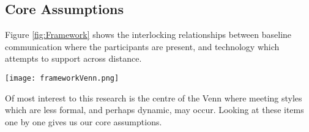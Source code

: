 \subsection{Core Assumptions}
Figure \ref{fig:Framework} shows the interlocking relationships between baseline communication where the participants are present, and technology which attempts to support across distance.
                \begin{figure*}[h]
                \centering
                \texttt{[image: frameworkVenn.png]}
                \caption{The Venn diagram shows areas of research which have been identified in blue. These interlock and overlap as shown. The most relevant identified researchers from the literature are shown in black close to the fields of study which they represent. This diagram is a view of the core assumptions for the research, with the most important fields at the centre. }
                \label{fig:Framework}
                \end{figure*}
                
Of most interest to this research is the centre of the Venn where meeting styles which are less formal, and perhaps dynamic, may occur. Looking at these items one by one gives us our core assumptions.

